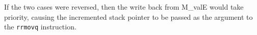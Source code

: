 \documentclass{article}
\begin{document}
If the two cases were reversed, then the write back from M\_valE would take
priority, causing the incremented stack pointer to be passed as the argument
to the \texttt{rrmovq} instruction.
\end{document}
